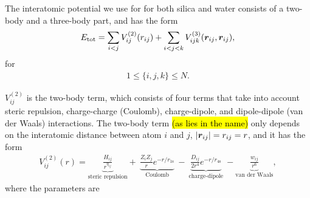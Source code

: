 The interatomic potential\cite{vashishta1990interaction}  we use for for both silica and water consists of a two-body and a three-body part, and has the form
\begin{align*}
    E_\text{tot} = \sum_{i<j} V_{ij}^{(2)}(r_{ij}) + \sum_{i<j<k}V_{ijk}^{(3)}(\boldsymbol{r}_{ij},\boldsymbol{r}_{ij}),
\end{align*}
for
\begin{align*}
    1\leq \{i,j,k\} \leq N.
\end{align*}

$V_{ij}^{(2)}$ is the two-body term, which consists of four terms that take into account steric repulsion, charge-charge (Coulomb), charge-dipole, and dipole-dipole (van der Waals) interactions. The two-body term \hl{(as lies in the name)} only depends on the interatomic distance between atom $i$ and $j$, $|\boldsymbol{r}_{ij}| = r_{ij} = r$, and it has the form%
\begin{align*}
    V_{ij}^{(2)} (r) = 
    \underbrace{
        \frac{H_{ij}}{r^{\eta_{ij}}}
    }_{\text{steric repulsion}}
    +~ 
    \underbrace{
        \frac{Z_iZ_j}{r}e^{-r/r_{1\text{s}}}
    }_{\text{Coulomb}}
    ~-~
    \underbrace{
        \frac{D_{ij}}{2r^4}e^{-r/r_{4\text{s}}}
    }_{\text{charge-dipole}}
    ~- 
    \underbrace{
        \frac{w_{ij}}{r^6}
    }_{\text{van der Waals}}
    ,
\end{align*}%
where the parameters are%
